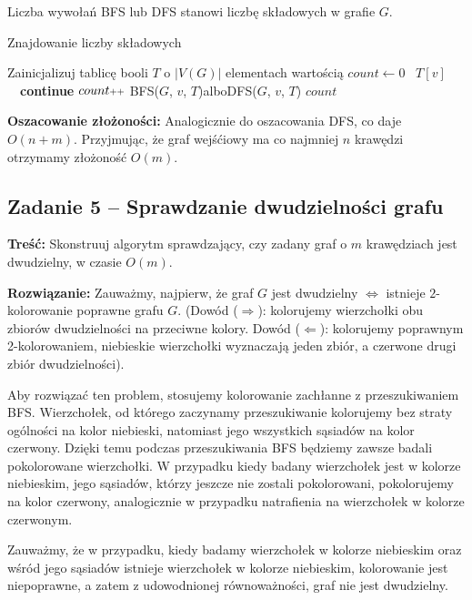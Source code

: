 Liczba wywołań BFS lub DFS stanowi liczbę składowych w grafie $G$.

\begin{algorithm}[H]
	\caption{Znajdowanie liczby składowych}\label{Zadanie24}
	\begin{algorithmic}[1]
		\State Zainicjalizuj tablicę booli $T$ o $|V(G)|$ elementach wartością \false
		\State $count\gets0$
			\State \algorithmicif\ $T[v]$\ \algorithmicthen\ \textbf{continue} %
			\State $count\pp$
			\State BFS($G$, $v$, $T$)\quad albo\quad DFS($G$, $v$, $T$)
		\EndFor
		\State \Return $count$
		\EndProcedure
	\end{algorithmic}
\end{algorithm}

\textbf{Oszacowanie złożoności:} Analogicznie do oszacowania DFS, co daje $O(n + m)$. Przyjmując, że
graf wejśćiowy ma co najmniej $n$ krawędzi otrzymamy złożoność  $O(m)$.

\subsection{Zadanie 5 -- Sprawdzanie dwudzielności grafu}
\label{exc:bipart}
\textbf{Treść: } Skonstruuj algorytm sprawdzający, 
czy zadany graf o $m$ krawędziach jest dwudzielny, w czasie $O(m)$.

\textbf{Rozwiązanie: } Zauważmy, najpierw, że 
graf $G$ jest dwudzielny $\Leftrightarrow$ istnieje $2$-kolorowanie
poprawne grafu $G$. (Dowód ($\Rightarrow$): kolorujemy 
wierzchołki obu zbiorów dwudzielności na przeciwne kolory. Dowód 
($\Leftarrow$): kolorujemy poprawnym 2-kolorowaniem, niebieskie
wierzchołki wyznaczają jeden zbiór, a czerwone drugi zbiór dwudzielności). 

Aby rozwiązać ten problem, stosujemy kolorowanie 
zachłanne z przeszukiwaniem BFS. 
Wierzchołek, od którego zaczynamy przeszukiwanie kolorujemy bez straty
ogólności na kolor niebieski, natomiast jego wszystkich sąsiadów na kolor czerwony.
Dzięki temu podczas przeszukiwania BFS będziemy zawsze badali pokolorowane 
wierzchołki. W przypadku kiedy badany wierzchołek jest w kolorze niebieskim, jego 
sąsiadów, którzy jeszcze nie zostali pokolorowani, pokolorujemy na kolor czerwony, analogicznie
w przypadku natrafienia na wierzchołek w kolorze czerwonym. 

Zauważmy, że w przypadku, kiedy badamy wierzchołek w kolorze niebieskim oraz wśród jego sąsiadów
istnieje wierzchołek w kolorze niebieskim, kolorowanie jest niepoprawne, a zatem z udowodnionej 
równoważności, graf nie jest dwudzielny.

